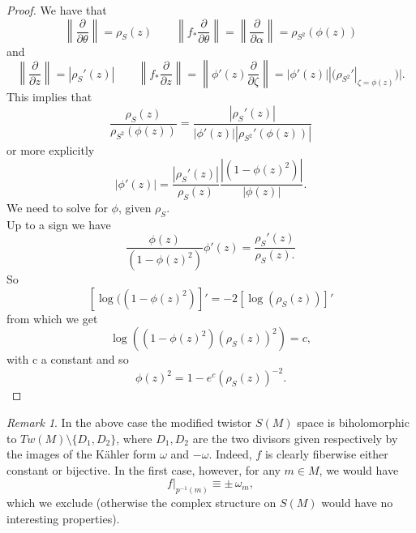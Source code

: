 \documentclass[11pt]{amsart}
\theoremstyle{definition}
\theoremstyle{plain}
\theoremstyle{definition}
\theoremstyle{plain}
\theoremstyle{remark}
\newtheorem{rmk}[Def]{Remark}
\theoremstyle{plain}
\newcommand{\de}{\partial}
\begin{document}
\begin{proof}
We have that
\[
\left\| \frac{\de}{\de \theta} \right\| = \rho_{S}(z)       \qquad
\left\| f_*\frac{\de}{\de \theta} \right\|= \left\| \frac{\de}{\de \alpha} \right\|= \rho_{S^2}(\phi(z))
\]
and
\[
\left\| \frac{\de}{\de z} \right\|=|\rho_{S}'(z)| \qquad 
\left\| f_*\frac{\de}{\de z} \right\|= \left\| \phi'(z) \frac{\de}{\de \zeta} \right\|= |\phi'(z)| |(\rho_{S^2}'|_{\zeta=\phi(z)})|.
\]
This implies that
\[
\frac{\rho_{S}(z)}{\rho_{S^2}(\phi(z))}= \frac{|\rho_{S}'(z)|}{|\phi'(z)| |\rho_{S^2}'(\phi(z))|}
\]
or more explicitly
\[
|\phi'(z)|=    \frac{|\rho_{S}'(z)|    }{ \rho_{S}(z)}
                \frac{|(1-\phi(z)^2)|}{|\phi(z)|}.
\]
We need to solve for $\phi$, given $\rho_S$. \\
Up to a sign we have
$$
    \frac{\phi(z)} { (1-\phi(z)^2)}  \phi'(z) =   \frac{\rho_{S}'(z)    }{ \rho_{S}(z).}
              $$
              So
              $$
             [ \log ((1-\phi(z)^2) ]' =  - 2  [\log  (\rho_{S}  (z))]' 
              $$
              from which we get
              \[
              \log  \left ( (1-\phi(z)^2) (\rho_S (z))^2 \right) =c, 
              \]
              with c a constant and so 
              \[
              \phi(z)^2 = 1 -  e^c  ( \rho_S (z))^{- 2}.
              \]
\end{proof}             


\smallskip

\begin{rmk}\label{Rmk1}
    In the above case the modified twistor $S(M)$ space is biholomorphic to $Tw(M)\setminus \{D_1, D_2\}$, where $D_1, D_2$ are the two divisors given respectively by the images of the K\"{a}hler form $\omega$ and  $-\omega$. Indeed, $f$ is clearly fiberwise either constant or bijective. In the first case, however, for any $m\in M$, we would have $$f|_{p^{-1}(m)}\equiv \pm  \, \omega_m,$$ which we exclude (otherwise the complex structure on $S(M)$ would have no interesting properties). \\
\end{rmk}
\end{document}
